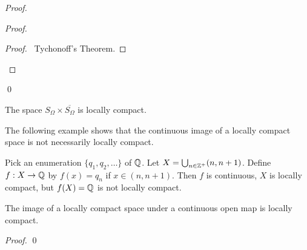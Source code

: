 \begin{proof}
    \begin{proof}
        \begin{proof}
            \pf\ Tychonoff's Theorem.
        \end{proof}
    \end{proof}
    \qed
\end{proof}

\begin{example}
    The space $S_\Omega \times \overline{S_\Omega}$ is locally compact.
\end{example}

The following example shows that the continuous image of a locally compact space is not necessarily
locally compact.

\begin{example}
    Pick an enumeration $\{ q_1, q_2, \ldots \}$ of $\mathbb{Q}$. Let $X = \bigcup_{n \in \mathbb{Z}^+} (n, n+1)$.
    Define $f : X \rightarrow \mathbb{Q}$ by $f(x) = q_n$ if $x \in (n, n+1)$. Then $f$ is continuous,
    $X$ is locally compact, but $f(X) = \mathbb{Q}$ is not locally compact.
\end{example}

\begin{proposition}
    \label{proposition:continuous_open_image_locally_compact}
    The image of a locally compact space under a continuous open map is locally compact.
\end{proposition}

\begin{proof}
    \pf
    \qed
\end{proof}

